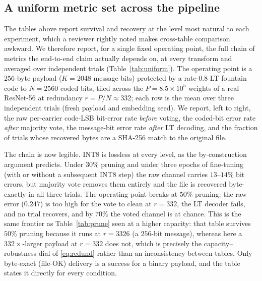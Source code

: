 \documentclass[10pt,journal]{IEEEtran}
\theoremstyle{remark}
\begin{document}
\subsection{A uniform metric set across the pipeline}\label{sec:uniform}
The tables above report survival and recovery at the level most natural to each
experiment, which a reviewer rightly noted makes cross-table comparison awkward. We
therefore report, for a single fixed operating point, the full chain of metrics the
end-to-end claim actually depends on, at every transform and averaged over independent
trials (Table~\ref{tab:uniform}). The operating point is a $256$-byte payload
($K{=}2048$ message bits) protected by a rate-$0.8$ LT fountain code to $N{=}2560$ coded
bits, tiled across the $P=8.5\times10^{5}$ weights of a real ResNet-56 at redundancy
$r=P/N\approx332$; each row is the mean over three independent trials (fresh payload and
embedding seed). We report, left to right, the raw per-carrier code-LSB bit-error rate
\emph{before} voting, the coded-bit error rate \emph{after} majority vote, the message-bit
error rate \emph{after} LT decoding, and the fraction of trials whose recovered bytes are a
SHA-256 match to the original file.

The chain is now legible. INT8 is lossless at every level, as the by-construction argument
predicts. Under $30\%$ pruning and under three epochs of fine-tuning (with or without a
subsequent INT8 step) the raw channel carries $13$--$14\%$ bit errors, but majority vote
removes them entirely and the file is recovered byte-exactly in all three trials. The
operating point breaks at $50\%$ pruning: the raw error ($0.247$) is too high for the vote to
clean at $r{=}332$, the LT decoder fails, and no trial recovers, and by $70\%$ the voted
channel is at chance. This is the same frontier as Table~\ref{tab:prune} seen at a higher
capacity: that table survives $50\%$ pruning because it runs at $r{=}3326$ (a $256$-bit
message), whereas here a $332\times$-larger payload at $r{=}332$ does not, which is precisely
the capacity--robustness dial of \eqref{eq:redund} rather than an inconsistency between
tables. Only byte-exact (file-OK) delivery is a success for a binary payload, and the table
states it directly for every condition.
\end{document}
